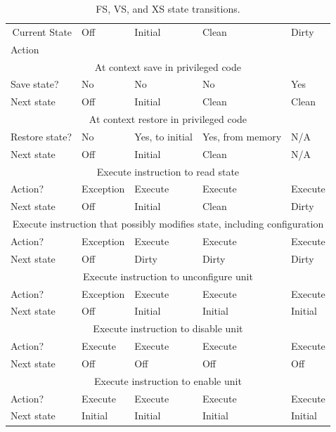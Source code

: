 \begin{table}[h!]
\begin{center}
\begin{tabular}{|l|l|l|l|l|}
\hline
\multicolumn{1}{|r|}{Current State} & Off & Initial & Clean & Dirty \\
Action & & & &\\
\hline
\hline
\multicolumn{5}{|c|}{At context save in privileged code}\\
\hline
Save state?    & No         & No        & No     & Yes \\
Next state       & Off        & Initial   & Clean  & Clean \\
\hline
\hline
\multicolumn{5}{|c|}{At context restore in privileged code}\\
\hline
Restore state? & No        & Yes, to initial & Yes, from memory   & N/A \\
Next state     & Off       & Initial   & Clean  & N/A \\
\hline
\hline
\multicolumn{5}{|c|}{Execute instruction to read state}\\
\hline
Action?        & Exception & Execute   & Execute & Execute \\
Next state     & Off       & Initial   & Clean  & Dirty \\
\hline
\hline
\multicolumn{5}{|c|}{Execute instruction that possibly modifies state, including configuration}\\
\hline
Action?        & Exception & Execute & Execute & Execute \\
Next state     & Off       & Dirty   & Dirty  & Dirty \\
\hline
\hline
\multicolumn{5}{|c|}{Execute instruction to unconfigure unit}\\
\hline
Action?        & Exception & Execute & Execute & Execute \\
Next state     & Off       & Initial & Initial & Initial \\
\hline
\hline
\multicolumn{5}{|c|}{Execute instruction to disable unit}\\
\hline
Action?        & Execute   & Execute & Execute & Execute \\
Next state     & Off       & Off     & Off     & Off \\
\hline
\hline
\multicolumn{5}{|c|}{Execute instruction to enable unit}\\
\hline
Action?        & Execute   & Execute & Execute & Execute \\
Next state     & Initial   & Initial & Initial & Initial   \\
\hline
\end{tabular}
\end{center}
\caption{FS, VS, and XS state transitions.}
\label{fsxsstates}
\end{table}

